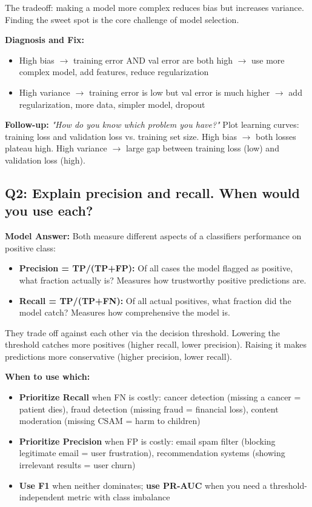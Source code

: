 \documentclass[11pt]{article}
\providecommand{\tightlist}{\setlength{\itemsep}{1pt}\setlength{\parskip}{0pt}}
\begin{document}
The tradeoff: making a model more complex reduces bias but increases variance. Finding the sweet spot is the core challenge of model selection.

\textbf{Diagnosis and Fix:}

\begin{itemize}
\tightlist
\item
  High bias \(\rightarrow\) training error AND val error are both high \(\rightarrow\) use more complex model, add features, reduce regularization
\item
  High variance \(\rightarrow\) training error is low but val error is much higher \(\rightarrow\) add regularization, more data, simpler model, dropout
\end{itemize}

\textbf{Follow-up:} \emph{"How do you know which problem you have?"}
Plot learning curves: training loss and validation loss vs. training set size. High bias \(\rightarrow\) both losses plateau high. High variance \(\rightarrow\) large gap between training loss (low) and validation loss (high).

\subsection{Q2: Explain precision and recall. When would you use each?}\label{q2-explain-precision-and-recall-when-would-you-use-each}

\textbf{Model Answer:}
Both measure different aspects of a classifier\textquotesingle s performance on positive class:

\begin{itemize}
\tightlist
\item
  \textbf{Precision = TP/(TP+FP):} Of all cases the model flagged as positive, what fraction actually is? Measures how trustworthy positive predictions are.
\item
  \textbf{Recall = TP/(TP+FN):} Of all actual positives, what fraction did the model catch? Measures how comprehensive the model is.
\end{itemize}

They trade off against each other via the decision threshold. Lowering the threshold catches more positives (higher recall, lower precision). Raising it makes predictions more conservative (higher precision, lower recall).

\textbf{When to use which:}

\begin{itemize}
\tightlist
\item
  \textbf{Prioritize Recall} when FN is costly: cancer detection (missing a cancer = patient dies), fraud detection (missing fraud = financial loss), content moderation (missing CSAM = harm to children)
\item
  \textbf{Prioritize Precision} when FP is costly: email spam filter (blocking legitimate email = user frustration), recommendation systems (showing irrelevant results = user churn)
\item
  \textbf{Use F1} when neither dominates; \textbf{use PR-AUC} when you need a threshold-independent metric with class imbalance
\end{itemize}
\end{document}
